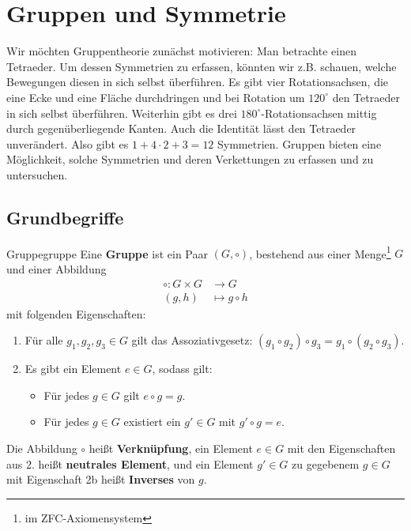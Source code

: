 \section{Gruppen und Symmetrie}
\label{gruppentheorie}

\begin{bemerkung}
Wir möchten Gruppentheorie zunächst motivieren: Man betrachte einen Tetraeder. Um dessen Symmetrien zu erfassen, könnten wir z.B. schauen, welche Bewegungen diesen in sich selbst überführen. Es gibt vier Rotationsachsen, die eine Ecke und eine Fläche durchdringen und bei Rotation um $120^\circ$ den Tetraeder in sich selbst überführen. Weiterhin gibt es drei $180^\circ$-Rotationsachsen mittig durch gegenüberliegende Kanten. Auch die Identität lässt den Tetraeder unverändert. Also gibt es $1+4 \cdot 2 + 3 = 12$ Symmetrien. Gruppen bieten eine Möglichkeit, solche Symmetrien und deren Verkettungen zu erfassen und zu untersuchen.
\end{bemerkung}

\subsection{Grundbegriffe}
\label{subsec:grundbegriffe}

\begin{definition}{Gruppe}{gruppe}
Eine \textbf{Gruppe} ist ein Paar $(G, \circ)$, bestehend aus einer Menge\footnote{im ZFC-Axiomensystem} $G$ und einer Abbildung
\begin{align}
\circ: G \times G &\to G\\
(g,h) &\mapsto g \circ h
\end{align} 
mit folgenden Eigenschaften:
\begin{enumerate}
\item Für alle $g_1,g_2,g_3 \in G$ gilt das Assoziativgesetz: $(g_1 \circ g_2) \circ g_3 = g_1 \circ (g_2 \circ g_3)$.
\item Es gibt ein Element $e \in G$, sodass gilt:
\begin{itemize}
\item Für jedes $g \in G$ gilt $e \circ g = g$.
\item Für jedes $g \in G$ existiert ein $g' \in G$ mit $g' \circ g = e$.
\end{itemize}
\end{enumerate}
Die Abbildung $\circ$ heißt \textbf{Verknüpfung}, ein Element $e \in G$ mit den Eigenschaften aus 2. heißt \textbf{neutrales Element}, und ein Element $g' \in G$ zu gegebenem $g \in G$ mit Eigenschaft 2b heißt \textbf{Inverses} von $g$.
\end{definition}

